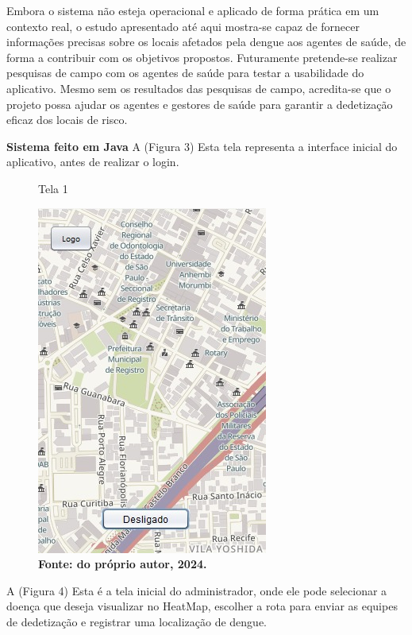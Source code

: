 Embora o sistema não esteja operacional e aplicado de forma prática em um contexto real, o estudo apresentado até aqui mostra-se capaz de fornecer informações precisas sobre os locais afetados pela dengue aos agentes de saúde, de forma a contribuir com os objetivos propostos. Futuramente pretende-se realizar pesquisas de campo com os agentes de saúde para testar a usabilidade do aplicativo. Mesmo sem os resultados das pesquisas de campo, acredita-se que o projeto possa ajudar os agentes e gestores de saúde para garantir a dedetização eficaz dos locais de risco.\newline

\textbf{Sistema feito em Java}\newline
A (Figura 3) Esta tela representa a interface inicial do aplicativo, antes de realizar o login.

\begin{figure}[H]
    \centering
    \caption{Tela 1}
    \includegraphics[width=0.5\linewidth]{Illustrations/Visi_Seco.jpg}
    \caption*{\textbf{Fonte: do próprio autor, 2024.}}
\end{figure}

\vspace{12pt}

A (Figura 4) Esta é a tela inicial do administrador, onde ele pode selecionar a doença que deseja visualizar no HeatMap, escolher a rota para enviar as equipes de dedetização e registrar uma localização de dengue.

